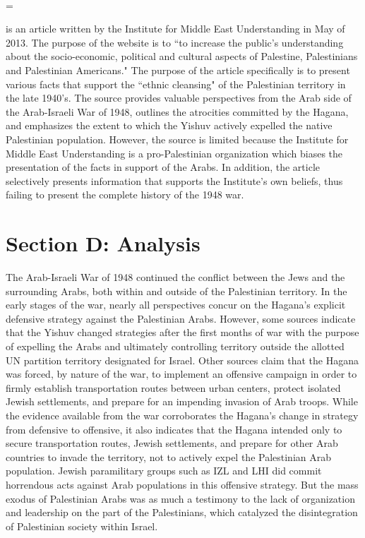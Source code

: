 \documentclass[12pt]{turabian-researchpaper}
\begin{document}
~\\



\hangindent=\parindent \noindent {}



 is an article written by the Institute for Middle East Understanding in May of 2013.  The purpose of the website is to ``to increase the public's understanding about the socio-economic, political and cultural aspects of Palestine, Palestinians and Palestinian Americans."  The purpose of the article specifically is to present various facts that support the ``ethnic cleansing" of the Palestinian territory in the late 1940's.  The source provides valuable perspectives from the Arab side of the Arab-Israeli War of 1948, outlines the atrocities committed by the Hagana, and emphasizes the extent to which the Yishuv actively expelled the native Palestinian population.  However, the source is limited because the Institute for Middle East Understanding is a pro-Palestinian organization which biases the presentation of the facts in support of the Arabs.  In addition, the article selectively presents information that supports the Institute's own beliefs, thus failing to present the complete history of the 1948 war.


\section{Section D: Analysis}



The Arab-Israeli War of 1948 continued the conflict between the Jews and the surrounding Arabs, both within and outside of the Palestinian territory.  In the early stages of the war, nearly all perspectives concur on the Hagana's explicit defensive strategy against the Palestinian Arabs.
However, some sources indicate that the Yishuv changed strategies after the first months of war with the purpose of expelling the Arabs and ultimately controlling territory outside the allotted UN partition territory designated for Israel.  Other sources claim that the Hagana was forced, by nature of the war, to implement an offensive campaign in order to firmly establish transportation routes between urban centers, protect isolated Jewish settlements, and prepare for an impending invasion of Arab troops.
While the evidence available from the war corroborates the Hagana's change in strategy from defensive to offensive, it also indicates that the Hagana intended only to secure transportation routes, Jewish settlements, and prepare for other Arab countries to invade the territory, not to actively expel the Palestinian Arab population.  Jewish paramilitary groups such as IZL and LHI did commit horrendous acts against Arab populations in this offensive strategy.  But the mass exodus of Palestinian Arabs was as much a testimony to the lack of organization and leadership on the part of the Palestinians, which catalyzed the disintegration of Palestinian society within Israel.
\end{document}
